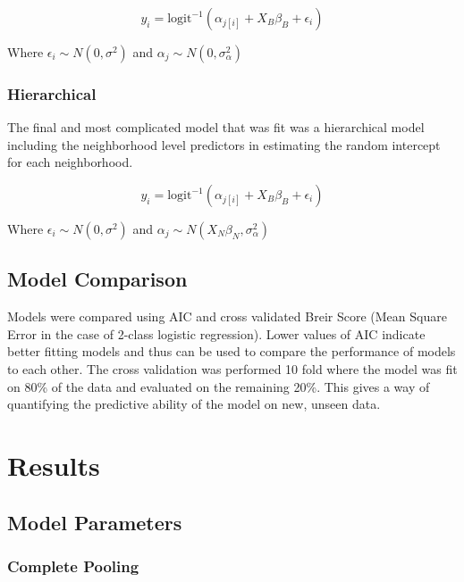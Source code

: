 \documentclass{report}
\begin{document}
$$ y_{i} = \text{logit}^{-1}\left( \alpha_{j[i]} + X_{B}\beta_{B} +  \epsilon_i \right) $$

Where $\epsilon_i \sim N(0, \sigma^2)$ and $\alpha_j \sim N(0, \sigma^2_\alpha)$

\subsubsection*{Hierarchical}

The final and most complicated model that was fit was a hierarchical model including the neighborhood level predictors in estimating the random intercept for each neighborhood. 

$$ y_{i} = \text{logit}^{-1}\left( \alpha_{j[i]} + X_{B}\beta_{B} +  \epsilon_i \right) $$

Where $\epsilon_i \sim N(0, \sigma^2)$ and $\alpha_j \sim N(X_N \beta_N, \sigma^2_\alpha)$


\subsection*{Model Comparison}

Models were compared using AIC and cross validated Breir Score (Mean Square Error in the case of 2-class logistic regression). Lower values of AIC indicate better fitting models and thus can be used to compare the performance of models to each other. The cross validation was performed 10 fold where the model was fit on 80\% of the data and evaluated on the remaining 20\%. This gives a way of quantifying the predictive ability of the model on new, unseen data. 

\section*{Results}

\subsection*{Model Parameters}

\subsubsection*{Complete Pooling}
\end{document}
